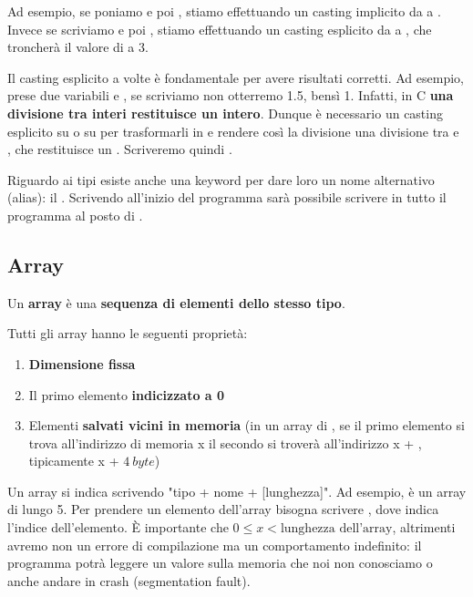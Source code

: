 \documentclass[11pt, a4paper, titlepage, oneside]{scrbook}
\begin{document}
Ad esempio, se poniamo  e poi , stiamo effettuando un casting implicito da  a . Invece se scriviamo  e poi , stiamo effettuando un casting esplicito da  a , che troncherà il valore di  a 3.

Il casting esplicito a volte è fondamentale per avere risultati corretti. Ad esempio, prese due variabili  e , se scriviamo  non otterremo 1.5, bensì 1. Infatti, in C \textbf{una divisione tra interi restituisce un intero}. Dunque è necessario un casting esplicito su  o su  per trasformarli in  e rendere così la divisione una divisione tra  e , che restituisce un . Scriveremo quindi .

Riguardo ai tipi esiste anche una keyword per dare loro un nome alternativo (alias): il . Scrivendo all'inizio del programma  sarà possibile scrivere in tutto il programma  al posto di .

\subsection{Array}

\begin{Definizione}[Array]
\label{def-array}
Un \textbf{array} è una \textbf{sequenza di elementi dello stesso tipo}.
\end{Definizione}

\begin{Proprieta}
\label{prop-proprieta-array}
Tutti gli array hanno le seguenti proprietà:
\begin{enumerate}
    \item \textbf{Dimensione fissa}
    \item Il primo elemento \textbf{indicizzato a 0}
    \item Elementi \textbf{salvati vicini in memoria} (in un array di , se il primo elemento si trova all'indirizzo di memoria x il secondo si troverà all'indirizzo x + , tipicamente x + $\SI{4}{byte}$)
\end{enumerate}
\end{Proprieta}

Un array si indica scrivendo "tipo + nome + [lunghezza]". Ad esempio,  è un array di  lungo 5. Per prendere un elemento dell'array bisogna scrivere , dove  indica l'indice dell'elemento. È importante che $0 \leq x < \text{lunghezza dell'array}$, altrimenti avremo non un errore di compilazione ma un comportamento indefinito: il programma potrà leggere un valore sulla memoria che noi non conosciamo o anche andare in crash (segmentation fault).
\end{document}
